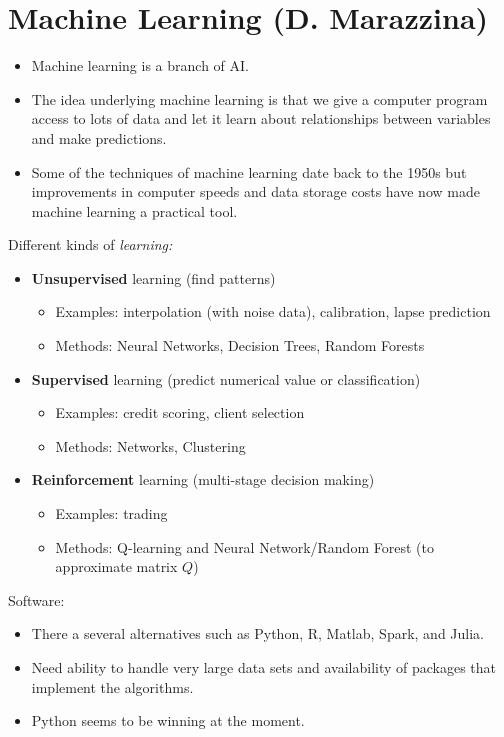 
\chapter{Machine Learning (D. Marazzina)}
\begin{itemize}
    \item Machine learning is a branch of AI.
    \item The idea underlying machine learning is that we give a computer program access to lots of data and let it learn about relationships between variables and make predictions.
    \item Some of the techniques of machine learning date back to the 1950s but improvements in computer speeds and data storage costs have now made machine learning a practical tool.
\end{itemize}

Different kinds of \textit{learning:}
\begin{itemize}
    \item \textbf{Unsupervised} learning (find patterns)
          \begin{itemize}
              \item Examples: interpolation (with noise data), calibration, lapse prediction 
              \item Methods: Neural Networks, Decision Trees, Random Forests
          \end{itemize}
    \item \textbf{Supervised} learning (predict numerical value or classification)
          \begin{itemize}
              \item Examples: credit scoring, client selection
              \item Methods: Networks, Clustering
          \end{itemize}
    \item \textbf{Reinforcement} learning (multi-stage decision making)
          \begin{itemize}
              \item Examples: trading
              \item Methods: Q-learning and Neural Network/Random Forest (to approximate matrix $Q$)
          \end{itemize}
\end{itemize}

Software:
\begin{itemize}
    \item There a several alternatives such as Python, R, Matlab, Spark, and Julia.
    \item Need ability to handle very large data sets and availability of packages that implement the algorithms.
    \item Python seems to be winning at the moment.
\end{itemize}

